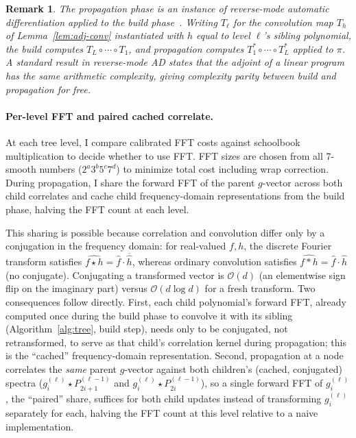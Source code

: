 \documentclass[11pt]{article}
\newtheorem{remark}[theorem]{Remark}
\newcommand{\bigO}{\mathcal{O}}
\begin{document}
\begin{remark}
The propagation phase is an instance of reverse-mode automatic
differentiation applied to the build phase~\citep{griewank2008}. Writing
$T_\ell$ for the convolution map $T_h$ of Lemma~\ref{lem:adj-conv}
instantiated with $h$ equal to level $\ell$'s sibling polynomial, the
build computes $T_L \circ \cdots \circ T_1$, and propagation computes
$T_1^{\ast} \circ \cdots \circ T_L^{\ast}$ applied to $\pi$. A
standard result in reverse-mode AD states that the adjoint of a linear
program has the same arithmetic complexity, giving complexity parity
between build and propagation for free.
\end{remark}

\paragraph{Per-level FFT and paired cached correlate.}
At each tree level, I compare calibrated FFT costs against schoolbook
multiplication to decide whether to use FFT. FFT sizes are chosen from
all 7-smooth numbers ($2^a 3^b 5^c 7^d$) to minimize total cost including
wrap correction. During propagation, I share the forward FFT of the parent
$g$-vector across both child correlates and cache child frequency-domain
representations from the build phase, halving the FFT count at each level.

This sharing is possible because correlation and convolution differ only
by a conjugation in the frequency domain: for real-valued $f, h$, the
discrete Fourier transform satisfies $\widehat{f \star h} = \hat f \cdot
\overline{\hat h}$, whereas ordinary convolution satisfies $\widehat{f * h}
= \hat f \cdot \hat h$ (no conjugate). Conjugating a transformed vector is
$\bigO(d)$ (an elementwise sign flip on the imaginary part) versus
$\bigO(d\log d)$ for a fresh transform. Two consequences
follow directly. First, each child polynomial's forward FFT, already
computed once during the build phase to convolve it with its sibling
(Algorithm~\ref{alg:tree}, build step), needs only to be conjugated, not
retransformed, to serve as that child's correlation kernel during
propagation; this is the ``cached'' frequency-domain representation.
Second, propagation at a node correlates the \emph{same} parent $g$-vector
against both children's (cached, conjugated) spectra
($g^{(\ell)}_i \star P^{(\ell-1)}_{2i+1}$ and
$g^{(\ell)}_i \star P^{(\ell-1)}_{2i}$), so a single forward FFT of
$g^{(\ell)}_i$, the ``paired'' share, suffices for both child updates
instead of transforming $g^{(\ell)}_i$ separately for each, halving the
FFT count at this level relative to a naive implementation.
\end{document}
